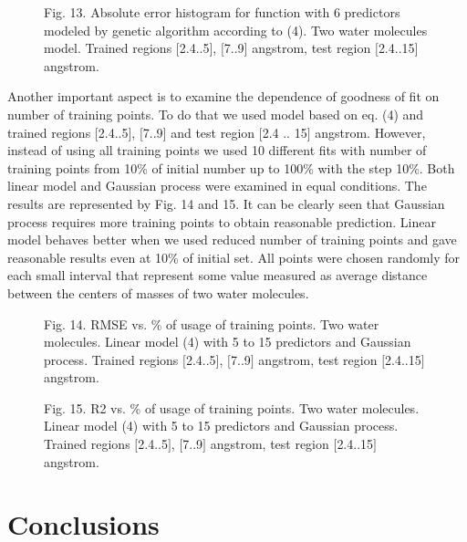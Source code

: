 \documentclass[aps,prl,reprint,amsmath,amssymb,nature]{revtex4-1}
\begin{document}
\begin{figure}[h]
\centering
\caption{Fig. 13. Absolute error histogram for function with 6 
predictors modeled by genetic algorithm according to (4). Two water 
molecules model. Trained regions $[$2.4..5$]$, $[$7..9$]$ angstrom, test 
region $[$2.4..15$]$ angstrom.}
\end{figure}

Another important aspect is to examine the dependence of goodness of fit 
on number of training points. To do that we used model based on eq. (4) 
and trained regions $[$2.4..5$]$, $[$7..9$]$ and test region $[$2.4 .. 
15$]$ angstrom. However, instead of using all training points we used 10 
different fits with number of training points from 10\% of initial 
number up to 100\% with the step 10\%. Both linear model and Gaussian 
process were examined in equal conditions. The results are represented 
by Fig. 14 and 15. It can be clearly seen that Gaussian process requires 
more training points to obtain reasonable prediction. Linear model 
behaves better when we used reduced number of training points and gave 
reasonable results even at 10\% of initial set. All points were chosen 
randomly for each small interval that represent some value measured as 
average distance between the centers of masses of two water molecules. 

\begin{figure}[h]
\centering
\caption{Fig. 14. RMSE vs. \% of usage of training points. Two water 
molecules. Linear model (4) with 5 to 15 predictors and Gaussian 
process. Trained regions $[$2.4..5$]$, $[$7..9$]$ angstrom, test region 
$[$2.4..15$]$ angstrom.}
\end{figure}


\begin{figure}[h]
\centering
\caption{Fig. 15. R2 vs. \% of usage of training points. Two water 
molecules. Linear model (4) with 5 to 15 predictors and Gaussian 
process. Trained regions $[$2.4..5$]$, $[$7..9$]$ angstrom, test region 
$[$2.4..15$]$ angstrom.}
\end{figure}


\section{Conclusions}
\end{document}
